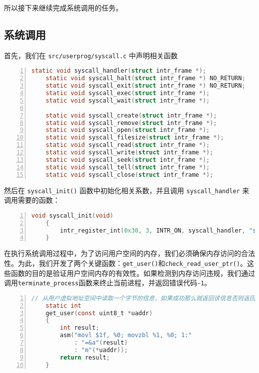 \documentclass{article}
\begin{document}
	所以接下来继续完成系统调用的任务。
	
	\subsection{系统调用}
	
	首先，我们在 \texttt{src/userprog/syscall.c} 中声明相关函数
	
	\begin{lstlisting}[xleftmargin = 4em,xrightmargin = 4em, aboveskip = 1em, numbers = left, language = C,title=\texttt{src/userprog/syscall.c} 中声明相关函数]
    static void syscall_handler(struct intr_frame *);
    static void syscall_halt(struct intr_frame *) NO_RETURN;
    static void syscall_exit(struct intr_frame *) NO_RETURN;
    static void syscall_exec(struct intr_frame *);
    static void syscall_wait(struct intr_frame *);
    
    static void syscall_create(struct intr_frame *);
    static void syscall_remove(struct intr_frame *);
    static void syscall_open(struct intr_frame *);
    static void syscall_filesize(struct intr_frame *);
    static void syscall_read(struct intr_frame *);
    static void syscall_write(struct intr_frame *);
    static void syscall_seek(struct intr_frame *);
    static void syscall_tell(struct intr_frame *);
    static void syscall_close(struct intr_frame *);
	\end{lstlisting}
	
	然后在 \texttt{syscall\_init()} 函数中初始化相关系数，并且调用 \texttt{syscall\_handler} 来调用需要的函数：
	
	\begin{lstlisting}[xleftmargin = 4em,xrightmargin = 4em, aboveskip = 1em, numbers = left, language = C,title=初始化函数]
    void syscall_init(void)
    {
    	intr_register_int(0x30, 3, INTR_ON, syscall_handler, "syscall");
    }
	\end{lstlisting}
	
	在执行系统调用过程中，为了访问用户空间的内存，我们必须确保内存访问的合法性。为此，我们开发了两个关键函数：\texttt{get\_user()}和\texttt{check\_read\_user\_ptr()}。这些函数的目的是验证用户空间内存的有效性。如果检测到内存访问违规，我们通过调用\texttt{terminate\_process}函数来终止当前进程，并返回错误代码\texttt{-1}。
	
	\begin{lstlisting}[xleftmargin = 4em,xrightmargin = 4em, aboveskip = 1em, numbers = left, language = C,title=src/userprog/syscall.c - \texttt{get\_user()}]
    // 从用户虚拟地址空间中读取一个字节的信息，如果成功那么就返回该信息否则返回-1
    static int
    get_user(const uint8_t *uaddr)
    {
    	int result;
    	asm("movl $1f, %0; movzbl %1, %0; 1:"
    	    : "=&a"(result)
    	    : "m"(*uaddr));
    	return result;
    }
	\end{lstlisting}
	
\end{document}
